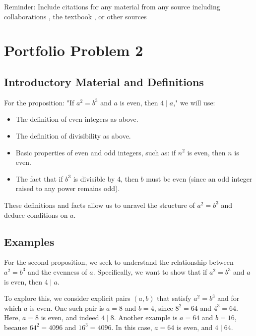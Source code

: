 \documentclass[12pt]{article}
\theoremstyle{definition}
\begin{document}
\noindent Reminder: Include citations for any material from any source including collaborations \cite{Collab1}, the textbook \cite{Sund21}, or other sources \cite{Whatever24}


\section{Portfolio Problem 2}

\subsection{Introductory Material and Definitions}

For the proposition: "If \( a^2 = b^3 \) and \( a \) is even, then \( 4 \mid a \)," we will use:

\begin{itemize}
    \item The definition of even integers as above.
    \item The definition of divisibility as above.
    \item Basic properties of even and odd integers, such as: if \( n^2 \) is even, then \( n \) is even.
    \item The fact that if \( b^3 \) is divisible by 4, then \( b \) must be even (since an odd integer raised to any power remains odd).
\end{itemize}

These definitions and facts allow us to unravel the structure of \( a^2 = b^3 \) and deduce conditions on \( a \).

\subsection{Examples}

For the second proposition, we seek to understand the relationship between \(a^2 = b^3\) and the evenness of \(a\). Specifically, we want to show that if \(a^2 = b^3\) and \(a\) is even, then \(4 \mid a\).

To explore this, we consider explicit pairs \((a, b)\) that satisfy \(a^2 = b^3\) and for which \(a\) is even. One such pair is \(a = 8\) and \(b = 4\), since \(8^2 = 64\) and \(4^3 = 64\). Here, \(a = 8\) is even, and indeed \(4 \mid 8\). Another example is \(a = 64\) and \(b = 16\), because \(64^2 = 4096\) and \(16^3 = 4096\). In this case, \(a = 64\) is even, and \(4 \mid 64\).
\end{document}
